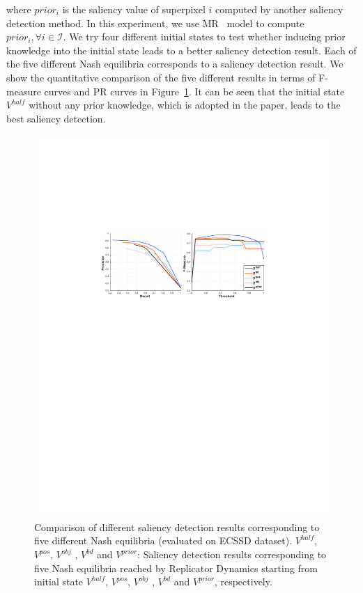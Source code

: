 \documentclass[journal]{IEEEtran}
\begin{document}
where $prior_i$ is the saliency value of superpixel $i$ computed by another saliency detection method. In this experiment, we use MR~\cite{yang2013saliency} model to compute $prior_i, \forall i \in \mathcal{I}$. We try four different initial states to test whether inducing prior knowledge into the initial state leads to a better saliency detection result. Each of the five different Nash equilibria corresponds to a saliency detection result. We show the quantitative comparison of the five different results in terms of F-measure curves and PR curves in Figure~\ref{othereq}. It can be seen that the initial state  $V^{half}$ without any prior knowledge, which is adopted in the paper, leads to the best saliency detection.  
\begin{figure}[htbp]
\label{othereq}
\begin{center}
\includegraphics[width=1\linewidth]{othereq.pdf}
\end{center}
\vspace{-10pt}
\caption{Comparison of different saliency detection results corresponding to five different Nash equilibria (evaluated on ECSSD dataset). $V^{half}$, $V^{pos}$, $V^{obj}$ , $V^{bd}$ and $V^{prior}$: Saliency detection results corresponding to five Nash equilibria reached by Replicator Dynamics starting from initial state $V^{half}$, $V^{pos}$, $V^{obj}$ , $V^{bd}$ and $V^{prior}$, respectively. }
\end{figure}
\end{document}
